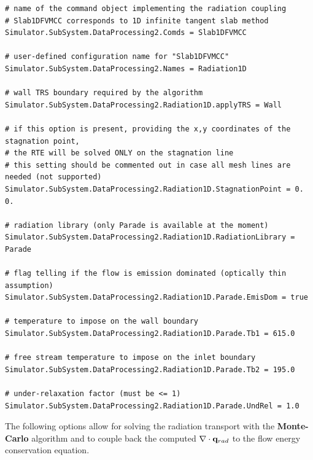 \documentclass[11pt]{article}
\begin{document}
\begin{lstlisting}[breaklines]
# name of the command object implementing the radiation coupling
# Slab1DFVMCC corresponds to 1D infinite tangent slab method
Simulator.SubSystem.DataProcessing2.Comds = Slab1DFVMCC

# user-defined configuration name for "Slab1DFVMCC"
Simulator.SubSystem.DataProcessing2.Names = Radiation1D

# wall TRS boundary required by the algorithm 
Simulator.SubSystem.DataProcessing2.Radiation1D.applyTRS = Wall

# if this option is present, providing the x,y coordinates of the stagnation point,
# the RTE will be solved ONLY on the stagnation line
# this setting should be commented out in case all mesh lines are needed (not supported)
Simulator.SubSystem.DataProcessing2.Radiation1D.StagnationPoint = 0. 0.

# radiation library (only Parade is available at the moment)
Simulator.SubSystem.DataProcessing2.Radiation1D.RadiationLibrary = Parade

# flag telling if the flow is emission dominated (optically thin assumption) 
Simulator.SubSystem.DataProcessing2.Radiation1D.Parade.EmisDom = true

# temperature to impose on the wall boundary 
Simulator.SubSystem.DataProcessing2.Radiation1D.Parade.Tb1 = 615.0

# free stream temperature to impose on the inlet boundary 
Simulator.SubSystem.DataProcessing2.Radiation1D.Parade.Tb2 = 195.0

# under-relaxation factor (must be <= 1)
Simulator.SubSystem.DataProcessing2.Radiation1D.Parade.UndRel = 1.0
\end{lstlisting}

The following options allow for solving the radiation transport with the \textbf{Monte-Carlo} algorithm 
and to couple back the computed $\nabla \cdot {\bf q}_{rad}$ to the flow energy conservation equation. 
\end{document}
